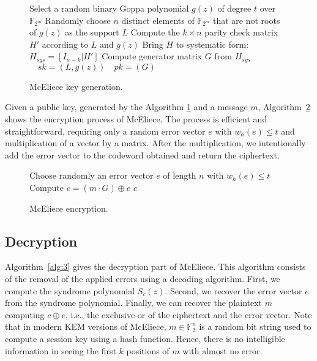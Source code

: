 \begin{figure}[ht]
\centering
\begin{algorithm}[H]
 Select a random binary Goppa polynomial $g(z)$ of degree $t$ over $\mathbb{F}_{2^{m}}$\;
 Randomly choose $n$ distinct elements of $\mathbb{F}_{2^m}$ that are not roots of $g(z)$ as the support $L$\;
 Compute the $k \times n$ parity check matrix $H'$ according to $L$ and $g(z)$\;
 Bring $H$ to systematic form: $H_{sys} = [I_{n-k}|H']$\;
 Compute generator matrix $G$ from $H_{sys}$\;
 \Return $\quad sk = (L, g(z)) \quad pk = (G)$\;
 \caption{McEliece key generation.}
 \label{alg:keygen}
\end{algorithm}
\end{figure}

Given a public key, generated by the Algorithm \ref{alg:keygen} and a message $m$, Algorithm~\ref{alg:2} shows the encryption process of McEliece. The process is efficient and straightforward, requiring only a random error vector $e$ with $w_h(e) \leq t$ and multiplication of a vector by a matrix. After the multiplication, we intentionally add the error vector to the codeword obtained and return the ciphertext.

\begin{figure}[ht]
\centering
\begin{algorithm}[H]
Choose randomly an error vector $e$ of length $n$ with $w_h(e)\leq t$\;
Compute $c = (m\cdot G) \oplus e$\;
\Return $c$\;
\caption{McEliece encryption.}\label{alg:2}
\end{algorithm}
\end{figure}

\subsection{Decryption}
\label{sub:mc-dec}
Algorithm~\ref{alg:3} gives the decryption part of McEliece. This algorithm consists of the removal of the applied errors using a decoding algorithm. First, we compute the syndrome polynomial $S_c(z)$. Second, we recover the error vector $e$ from the syndrome polynomial. Finally, we can recover the plaintext $m$ computing $c \oplus e$, i.e., the exclusive-or of the ciphertext and the error vector. Note that in modern KEM versions of McEliece, $m\in \mathbb{F}^n_{2}$ is a random bit string used to compute a session key using a hash function. Hence, there is no intelligible information in seeing the first $k$ positions of $m$ with almost no error.


